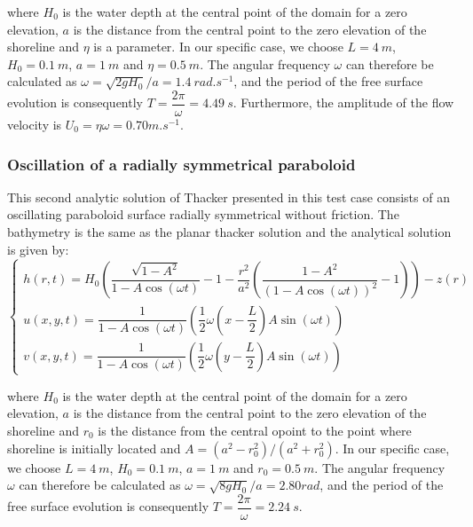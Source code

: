 where $H_0$ is the water depth at the central point of the domain for a zero elevation, $a$ is the distance from the central
point to the zero elevation of the shoreline and $\eta$ is a parameter.
In our specific case, we choose $L=4~m$, $H_0=0.1~m$, $a=1~m$ and $\eta=0.5~m$.
The angular frequency $\omega$ can therefore be calculated as $\omega = \sqrt{2gH_0}/a = 1.4~rad.s^{-1}$,
and the period of the free surface evolution is consequently $T= \dfrac{2 \pi}{\omega} = 4.49~s$.
Furthermore, the amplitude of the flow velocity is $U_0 = \eta \omega = 0.70 m.s^{-1}$.  \\

\subsubsection{Oscillation of a radially symmetrical paraboloid}

This second analytic solution of Thacker presented in this test case consists of an oscillating paraboloid surface radially symmetrical
without friction. The bathymetry is the same as the planar thacker solution and
the analytical solution is given by:
\begin{equation}
  \left\{
    \begin{array}{ll}
      h(r,t) = H_0 \left( \dfrac{\sqrt{1- A^2}}{1-A\cos(\omega t)} - 1 - \dfrac{r^2}{a^2}\left(\dfrac{1-A^2}{(1-A\cos(\omega t))^2} -1 \right)\right) - z(r)\\
      u(x,y,t) = \dfrac{1}{1-A\cos(\omega t)} \left( \dfrac{1}{2} \omega \left( x - \dfrac{L}{2} \right) A \sin(\omega t )\right) \\
      v(x,y,t) = \dfrac{1}{1-A\cos(\omega t)} \left( \dfrac{1}{2} \omega \left( y - \dfrac{L}{2} \right) A \sin(\omega t )\right)
    \end{array}
    \right.
    \label{eq:thacker2:analytical}
\end{equation}

where $H_0$ is the water depth at the central point of the domain for a zero
elevation, $a$ is the distance from the central point to the zero elevation of
the shoreline and $r_0$ is the distance from the central opoint to the point where shoreline is initially located and $A=(a^2-r_0^2)/(a^2+r_0^2)$.
In our specific case, we choose $L=4~m$, $H_0=0.1~m$, $a=1~m$ and $r_0=0.5~m$.
The angular frequency $\omega$ can therefore be calculated as $\omega = \sqrt{8gH_0}/a = 2.80rad$,
and the period of the free surface evolution is consequently $T= \dfrac{2 \pi}{\omega} = 2.24~s$.

